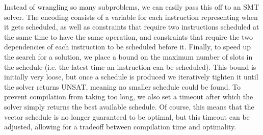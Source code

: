 Instead of wrangling so many subproblems, we can easily pass this off to an SMT solver.
The encoding consists of a variable for each instruction representing when it gets scheduled, as well as constraints that require two instructions scheduled at the same time to have the same operation, and constraints that require the two dependencies of each instruction to be scheduled before it.
Finally, to speed up the search for a solution, we place a bound on the maximum number of slots in the schedule (i.e. the latest time an instruction can be scheduled).
This bound is initially very loose, but once a schedule is produced we iteratively tighten it until the solver returns UNSAT, meaning no smaller schedule could be found. 
To prevent compilation from taking too long, we also set a timeout after which the solver simply returns the best available schedule.
Of course, this means that the vector schedule is no longer guaranteed to be optimal, but this timeout can be adjusted, allowing for a tradeoff between compilation time and optimality.

